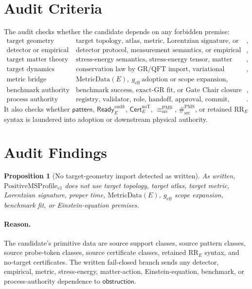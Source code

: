 \documentclass[11pt]{article}
\newcommand{\PMSProf}{\mathrm{PositiveMSProfile}_{v1}}
\newcommand{\Ready}{\mathsf{Ready}^{\mathrm{audit}}_E}
\newcommand{\Cert}{\mathsf{Cert}^{\mathrm{noT}}_E}
\newcommand{\EqProf}{\equiv^{\mathrm{PMS}}_{\mathrm{src}}}
\newcommand{\SepProf}{\#^{\mathrm{PMS}}_{\mathrm{src}}}
\newcommand{\Pattern}{\mathsf{pattern}}
\newcommand{\Obstruction}{\mathsf{obstruction}}
\newcommand{\RRE}{\mathrm{RR}_E}
\newcommand{\MetricData}{\mathrm{MetricData}}
\newcommand{\geff}{g_{\mathrm{eff}}}
\newtheorem{proposition}{Proposition}
\begin{document}
\section{Audit Criteria}

The audit checks whether the candidate depends on any forbidden premise:
\[
\begin{array}{ll}
\text{target geometry} &
  \text{target topology, atlas, metric, Lorentzian signature, or proper time},\\
\text{detector or empirical semantics} &
  \text{detector protocol, measurement semantics, or empirical calibration},\\
\text{target matter theory} &
  \text{stress-energy semantics, stress-energy tensor, matter action},\\
\text{target dynamics} &
  \text{conservation law by GR/QFT import, variational principle, field equation},\\
\text{metric bridge} &
  \MetricData(E),\ \geff\ \text{adoption or scope expansion},\\
\text{benchmark authority} &
  \text{benchmark success, exact-GR fit, or Gate Chair closure as proof},\\
\text{process authority} &
  \text{registry, validator, role, handoff, approval, commit, generated derivative, cache}.
\end{array}
\]
It also checks whether \(\Pattern\), \(\Ready\), \(\Cert\), \(\EqProf\),
\(\SepProf\), or retained \(\RRE\) syntax is laundered into adoption or
downstream physical authority.

\section{Audit Findings}

\begin{proposition}[No target-geometry import detected as written]
As written, \(\PMSProf\) does not use target topology, target atlas, target
metric, Lorentzian signature, proper time, \(\MetricData(E)\), \(\geff\)
scope expansion, benchmark fit, or Einstein-equation premises.
\end{proposition}

\paragraph{Reason.}
The candidate's primitive data are source support classes, source pattern
classes, source probe-token classes, source certificate classes, retained
\(\RRE\) syntax, and no-target certificates. The written fail-closed branch
sends any detector, empirical, metric, stress-energy, matter-action,
Einstein-equation, benchmark, or process-authority dependence to
\(\Obstruction\).
\end{document}

